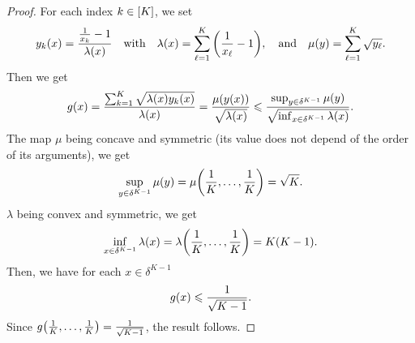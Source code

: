 \begin{proof}
For each index $k\in\range{K}$, we set
\begin{equation}
  y_k\bracket{x} = \frac{\frac{1}{x_k}-1}{\lambda\bracket{x}}
  \quad\mbox{with}\quad
  \lambda\bracket{x} = \sum_{\ell=1}^K\bracket{\frac{1}{x_{\ell}}-1}
  ,\quad\mbox{and}\quad 
  \mu\bracket{y} = \sum_{\ell=1}^K \sqrt{y_{\ell}}.
\end{equation}
Then we get
\begin{equation}
  g\bracket{x} = \frac{\sum_{k=1}^K\sqrt{\lambda\bracket{x}y_k\bracket{x}}}{\lambda\bracket{x}}
  = \frac{\mu\bracket{y\bracket{x}}}{\sqrt{\lambda\bracket{x}}}
  \le \frac{\sup_{y\in\delta^{K-1}}\mu\bracket{y}}{\sqrt{\inf_{x\in\delta^{K-1}}\lambda\bracket{x}}}.
\end{equation}
The map $\mu$ being concave and symmetric (\ie its value does not depend of the order of its arguments), we get
\begin{equation}
  \sup_{y\in\delta^{K-1}}\mu\bracket{y} = \mu\bracket{\frac{1}{K},\ldots,\frac{1}{K}} = \sqrt{K}.
\end{equation}
$\lambda$ being convex and symmetric, we get
\begin{equation}
  \inf_{x\in\delta^{K-1}}\lambda\bracket{x} = \lambda\bracket{\frac{1}{K},\ldots,\frac{1}{K}} = K\bracket{K-1}.
\end{equation}
Then, we have for each $x\in\delta^{K-1}$
\begin{equation}
  g\bracket{x} \le \frac{1}{\sqrt{K-1}}.
\end{equation}
Since $g\bracket{\frac{1}{K},\ldots,\frac{1}{K}}=\frac{1}{\sqrt{K-1}}$, the result follows.
\end{proof}


